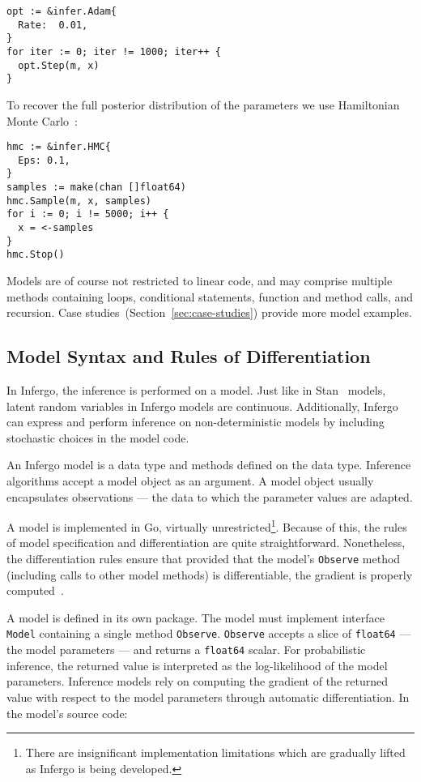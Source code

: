 \documentclass[sigplan,review,10pt,anonymous]{acmart}
\begin{document}
\begin{sloppypar}
\begin{lstlisting}
opt := &infer.Adam{
  Rate:  0.01,
}
for iter := 0; iter != 1000; iter++ {
  opt.Step(m, x)
}
\end{lstlisting}

To recover the full posterior distribution of
the parameters we use Hamiltonian Monte Carlo~\cite{N12}:

\begin{lstlisting}
hmc := &infer.HMC{
  Eps: 0.1,
}
samples := make(chan []float64)
hmc.Sample(m, x, samples)
for i := 0; i != 5000; i++ {
  x = <-samples
}
hmc.Stop()
\end{lstlisting}

Models are of course not restricted to linear code, and may
comprise multiple methods containing loops, conditional
statements, function and method calls, and recursion. Case
studies~(Section~\ref{sec:case-studies}) provide more
model examples.

\subsection{Model Syntax and Rules of Differentiation}

In Infergo, the inference is performed on a model. Just like in
Stan~\cite{Stan17} models, latent random variables in Infergo
models are continuous. Additionally, Infergo can express and
perform inference on non-deterministic models by including
stochastic choices in the model code.

An Infergo model is a data type and methods defined on the data
type.  Inference algorithms accept a model object as an
argument.  A model object usually encapsulates observations ---
the data to which the parameter values are adapted.

A model is implemented in Go, virtually
unrestricted\footnote{There are insignificant implementation
limitations which are gradually lifted as Infergo is being
developed.}. Because of this, the rules of model specification
and differentiation are quite straightforward. Nonetheless, the
differentiation rules ensure that provided that the model's
\lstinline{Observe} method (including calls to other model methods)
is differentiable, the gradient is properly computed~\cite{GW08}.

A model is defined in its own package. The model must
implement interface \lstinline{Model} containing a single method
\lstinline{Observe}. \lstinline{Observe} accepts a slice of
\lstinline{float64} --- the model parameters --- and returns a
\lstinline{float64} scalar. For probabilistic inference, the
returned value is interpreted as the log-likelihood of the model
parameters. Inference models rely on computing the gradient of
the returned value with respect to the model parameters through
automatic differentiation. In the model's source code:


\end{sloppypar}
\end{document}
